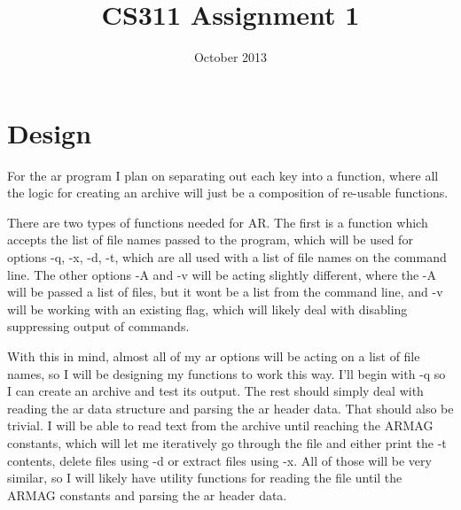 \documentclass[letterpaper,10pt]{article}
\title{CS311 Assignment 1}
\author{\name}
\date{October 2013}
\begin{document}
\maketitle

\section{Design}

For the ar program I plan on separating out each key into a function, where all
the logic for creating an archive will just be a composition of re-usable
functions.

There are two types of functions needed for AR. The first is a function which
accepts the list of file names passed to the program, which will be used for
options -q, -x, -d, -t, which are all used with a list of file names on the
command line. The other options -A and -v will be acting slightly different,
where the -A will be passed a list of files, but it wont be a list from the
command line, and -v will be working with an existing flag, which will likely
deal with disabling suppressing output of commands.

With this in mind, almost all of my ar options will be acting on a list of file
names, so I will be designing my functions to work this way. I'll begin with -q
so I can create an archive and test its output. The rest should simply deal
with reading the ar data structure and parsing the ar header data. That should
also be trivial. I will be able to read text from the archive until reaching
the ARMAG constants, which will let me iteratively go through the file and
either print the -t contents, delete files using -d or extract files using -x.
All of those will be very similar, so I will likely have utility functions for
reading the file until the ARMAG constants and parsing the ar header data.
\end{document}
